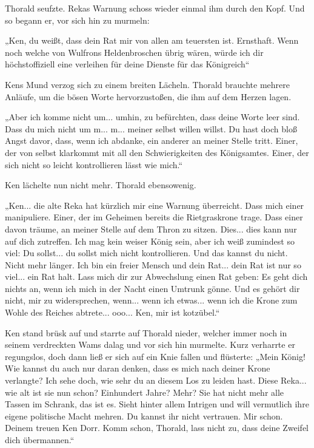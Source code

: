 Thorald seufzte. Rekas Warnung schoss wieder einmal ihm durch den Kopf. Und so begann er, vor sich hin zu murmeln:

„Ken, du weißt, dass dein Rat mir von allen am teuersten ist. Ernsthaft. Wenn noch welche von Wulfrons Heldenbroschen übrig wären, würde ich dir höchstoffiziell eine verleihen für deine Dienste für das Königreich“

Kens Mund verzog sich zu einem breiten Lächeln. Thorald brauchte mehrere Anläufe, um die bösen Worte hervorzustoßen, die ihm auf dem Herzen lagen.

„Aber ich komme nicht um... umhin, zu befürchten, dass deine Worte leer sind. Dass du mich nicht um m... m... meiner selbst willen willst. Du hast doch bloß Angst davor, dass, wenn ich abdanke, ein anderer an meiner Stelle tritt. Einer, der von selbst klarkommt mit all den Schwierigkeiten des Königsamtes. Einer, der sich nicht so leicht kontrollieren lässt wie mich.“

Ken lächelte nun nicht mehr. Thorald ebensowenig.

„Ken... die alte Reka hat kürzlich mir eine Warnung überreicht. Dass mich einer manipuliere. Einer, der im Geheimen bereits die Rietgraskrone trage. Dass einer davon träume, an meiner Stelle auf dem Thron zu sitzen. Dies... dies kann nur auf dich zutreffen. Ich mag kein weiser König sein, aber ich weiß zumindest so viel: Du sollst... du sollst mich nicht kontrollieren. Und das kannst du nicht. Nicht mehr länger. Ich bin ein freier Mensch und dein Rat... dein Rat ist nur so viel... ein Rat halt. Lass mich dir zur Abwechslung einen Rat geben: Es geht dich nichts an, wenn ich mich in der Nacht einen Umtrunk gönne. Und es gehört dir nicht, mir zu widersprechen, wenn... wenn ich etwas... wenn ich die Krone zum Wohle des Reiches abtrete... ooo... Ken, mir ist kotzübel.“

Ken stand brüsk auf und starrte auf Thorald nieder, welcher immer noch in seinem verdreckten Wams dalag und vor sich hin murmelte. Kurz verharrte er regungslos, doch dann ließ er sich auf ein Knie fallen und flüsterte: „Mein König! Wie kannst du auch nur daran denken, dass es mich nach deiner Krone verlangte? Ich sehe doch, wie sehr du an diesem Los zu leiden hast. Diese Reka... wie alt ist sie nun schon? Einhundert Jahre? Mehr? Sie hat nicht mehr alle Tassen im Schrank, das ist es. Sieht hinter allem Intrigen und will vermutlich ihre eigene politische Macht mehren. Du kannst ihr nicht vertrauen. Mir schon. Deinem treuen Ken Dorr. Komm schon, Thorald, lass nicht zu, dass deine Zweifel dich übermannen.“

